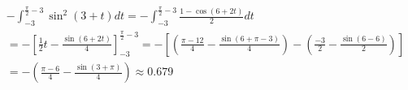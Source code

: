 \begin{itemize}
\begin{mdframed}
            \begin{equation*}
                \begin{gathered}
                    -\int_{-3}^{\frac{\pi}{2}-3}\sin^{2}(3+t)dt =
                    -\int_{-3}^{\frac{\pi}{2}-3}\frac{1-\cos(6+2t)}{2}dt        \\
                    = 
                    -\left[
                        \frac{1}{2}t-\frac{\sin(6+2t)}{4}
                    \right]_{-3}^{\frac{\pi}{2}-3} =
                    -\left[
                        \left(\frac{\pi-12}{4}-\frac{\sin(6+\pi-3)}{4}\right) -
                        \left(\frac{-3}{2}-\frac{\sin(6-6)}{2}\right)
                    \right]                                                     \\
                    =
                    -\left(\frac{\pi-6}{4}-\frac{\sin(3+\pi)}{4}\right) \approx \boxed{0.679}
                \end{gathered}
            \end{equation*}
        \end{mdframed}
        

\end{itemize}
